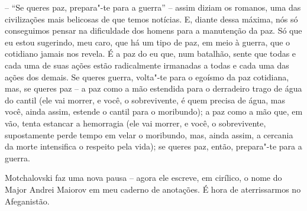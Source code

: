 -- ``Se queres paz, prepara"-te para a guerra'' -- assim diziam os
romanos, uma das civilizações mais belicosas de que temos notícias. E,
diante dessa máxima, nós só conseguimos pensar na dificuldade dos homens
para a manutenção da paz. Só que eu estou sugerindo, meu caro, que há um
tipo de paz, em meio à guerra, que o cotidiano jamais nos revela. É a
paz do eu que, num batalhão, sente que todas e cada uma de suas ações
estão radicalmente irmanadas a todas e cada uma das ações dos demais. Se
queres guerra, volta"-te para o egoísmo da paz cotidiana, mas, se queres
paz -- a paz como a mão estendida para o derradeiro trago de água do
cantil (ele vai morrer, e você, o sobrevivente, é quem precisa de água,
mas você, ainda assim, estende o cantil para o moribundo); a paz como a
mão que, em vão, tenta estancar a hemorragia (ele vai morrer, e você, o
sobrevivente, supostamente perde tempo em velar o moribundo, mas, ainda
assim, a cercania da morte intensifica o respeito pela vida); se queres
paz, então, prepara"-te para a guerra.

Motchalovski faz uma nova pausa -- agora ele escreve, em cirílico, o
nome do Major Andrei Maiorov em meu caderno de anotações. É hora de
aterrissarmos no Afeganistão.

